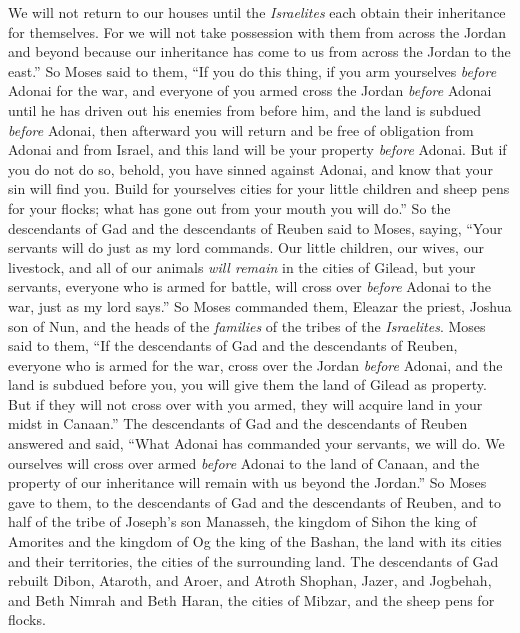 \begin{biblechapter}
\verse We will not return to our houses until the \textit{Israelites} each obtain their inheritance for themselves.
\verse For we will not take possession with them from across the Jordan and beyond because our inheritance has come to us from across the Jordan to the east.”
\verse So Moses said to them, “If you do this thing, if you arm yourselves \textit{before} Adonai for the war,
\verse and everyone of you armed cross the Jordan \textit{before} Adonai until he has driven out his enemies from before him,
\verse and the land is subdued \textit{before} Adonai, then afterward you will return and be free of obligation from Adonai and from Israel, and this land will be your property \textit{before} Adonai.
\verse But if you do not do so, behold, you have sinned against Adonai, and know that your sin will find you.
\verse Build for yourselves cities for your little children and sheep pens for your flocks; what has gone out from your mouth you will do.”
\verse So the descendants of Gad and the descendants of Reuben said to Moses, saying, “Your servants will do just as my lord commands.
\verse Our little children, our wives, our livestock, and all of our animals \textit{will remain} in the cities of Gilead,
\verse but your servants, everyone who is armed for battle, will cross over \textit{before} Adonai to the war, just as my lord says.”
\verse So Moses commanded them, Eleazar the priest, Joshua son of Nun, and the heads of the \textit{families} of the tribes of the \textit{Israelites}.
\verse Moses said to them, “If the descendants of Gad and the descendants of Reuben, everyone who is armed for the war, cross over the Jordan \textit{before} Adonai, and the land is subdued before you, you will give them the land of Gilead as property.
\verse But if they will not cross over with you armed, they will acquire land in your midst in Canaan.”
\verse The descendants of Gad and the descendants of Reuben answered and said, “What Adonai has commanded your servants, we will do.
\verse We ourselves will cross over armed \textit{before} Adonai to the land of Canaan, and the property of our inheritance will remain with us beyond the Jordan.”
\verse So Moses gave to them, to the descendants of Gad and the descendants of Reuben, and to half of the tribe of Joseph’s son Manasseh, the kingdom of Sihon the king of Amorites and the kingdom of Og the king of the Bashan, the land with its cities and their territories, the cities of the surrounding land.
\verse The descendants of Gad rebuilt Dibon, Ataroth, and Aroer,
\verse and Atroth Shophan, Jazer, and Jogbehah,
\verse and Beth Nimrah and Beth Haran, the cities of Mibzar, and the sheep pens for flocks.

\end{biblechapter}
